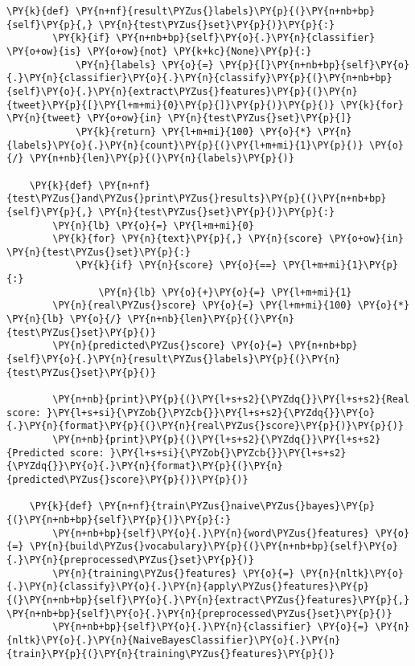 \documentclass[11pt]{article}
\begin{document}
\begin{tcolorbox}[breakable, size=fbox, boxrule=1pt, pad at break*=1mm,colback=cellbackground, colframe=cellborder]
\begin{Verbatim}[commandchars=\\\{\}]
    \PY{k}{def} \PY{n+nf}{result\PYZus{}labels}\PY{p}{(}\PY{n+nb+bp}{self}\PY{p}{,} \PY{n}{test\PYZus{}set}\PY{p}{)}\PY{p}{:}
        \PY{k}{if} \PY{n+nb+bp}{self}\PY{o}{.}\PY{n}{classifier} \PY{o+ow}{is} \PY{o+ow}{not} \PY{k+kc}{None}\PY{p}{:}
            \PY{n}{labels} \PY{o}{=} \PY{p}{[}\PY{n+nb+bp}{self}\PY{o}{.}\PY{n}{classifier}\PY{o}{.}\PY{n}{classify}\PY{p}{(}\PY{n+nb+bp}{self}\PY{o}{.}\PY{n}{extract\PYZus{}features}\PY{p}{(}\PY{n}{tweet}\PY{p}{[}\PY{l+m+mi}{0}\PY{p}{]}\PY{p}{)}\PY{p}{)} \PY{k}{for} \PY{n}{tweet} \PY{o+ow}{in} \PY{n}{test\PYZus{}set}\PY{p}{]}
            \PY{k}{return} \PY{l+m+mi}{100} \PY{o}{*} \PY{n}{labels}\PY{o}{.}\PY{n}{count}\PY{p}{(}\PY{l+m+mi}{1}\PY{p}{)} \PY{o}{/} \PY{n+nb}{len}\PY{p}{(}\PY{n}{labels}\PY{p}{)}

    \PY{k}{def} \PY{n+nf}{test\PYZus{}and\PYZus{}print\PYZus{}results}\PY{p}{(}\PY{n+nb+bp}{self}\PY{p}{,} \PY{n}{test\PYZus{}set}\PY{p}{)}\PY{p}{:}
        \PY{n}{lb} \PY{o}{=} \PY{l+m+mi}{0}
        \PY{k}{for} \PY{n}{text}\PY{p}{,} \PY{n}{score} \PY{o+ow}{in} \PY{n}{test\PYZus{}set}\PY{p}{:}
            \PY{k}{if} \PY{n}{score} \PY{o}{==} \PY{l+m+mi}{1}\PY{p}{:}
                \PY{n}{lb} \PY{o}{+}\PY{o}{=} \PY{l+m+mi}{1}
        \PY{n}{real\PYZus{}score} \PY{o}{=} \PY{l+m+mi}{100} \PY{o}{*} \PY{n}{lb} \PY{o}{/} \PY{n+nb}{len}\PY{p}{(}\PY{n}{test\PYZus{}set}\PY{p}{)}
        \PY{n}{predicted\PYZus{}score} \PY{o}{=} \PY{n+nb+bp}{self}\PY{o}{.}\PY{n}{result\PYZus{}labels}\PY{p}{(}\PY{n}{test\PYZus{}set}\PY{p}{)}

        \PY{n+nb}{print}\PY{p}{(}\PY{l+s+s2}{\PYZdq{}}\PY{l+s+s2}{Real score: }\PY{l+s+si}{\PYZob{}\PYZcb{}}\PY{l+s+s2}{\PYZdq{}}\PY{o}{.}\PY{n}{format}\PY{p}{(}\PY{n}{real\PYZus{}score}\PY{p}{)}\PY{p}{)}
        \PY{n+nb}{print}\PY{p}{(}\PY{l+s+s2}{\PYZdq{}}\PY{l+s+s2}{Predicted score: }\PY{l+s+si}{\PYZob{}\PYZcb{}}\PY{l+s+s2}{\PYZdq{}}\PY{o}{.}\PY{n}{format}\PY{p}{(}\PY{n}{predicted\PYZus{}score}\PY{p}{)}\PY{p}{)}

    \PY{k}{def} \PY{n+nf}{train\PYZus{}naive\PYZus{}bayes}\PY{p}{(}\PY{n+nb+bp}{self}\PY{p}{)}\PY{p}{:}
        \PY{n+nb+bp}{self}\PY{o}{.}\PY{n}{word\PYZus{}features} \PY{o}{=} \PY{n}{build\PYZus{}vocabulary}\PY{p}{(}\PY{n+nb+bp}{self}\PY{o}{.}\PY{n}{preprocessed\PYZus{}set}\PY{p}{)}
        \PY{n}{training\PYZus{}features} \PY{o}{=} \PY{n}{nltk}\PY{o}{.}\PY{n}{classify}\PY{o}{.}\PY{n}{apply\PYZus{}features}\PY{p}{(}\PY{n+nb+bp}{self}\PY{o}{.}\PY{n}{extract\PYZus{}features}\PY{p}{,} \PY{n+nb+bp}{self}\PY{o}{.}\PY{n}{preprocessed\PYZus{}set}\PY{p}{)}
        \PY{n+nb+bp}{self}\PY{o}{.}\PY{n}{classifier} \PY{o}{=} \PY{n}{nltk}\PY{o}{.}\PY{n}{NaiveBayesClassifier}\PY{o}{.}\PY{n}{train}\PY{p}{(}\PY{n}{training\PYZus{}features}\PY{p}{)}
\end{Verbatim}
\end{tcolorbox}
\end{document}
